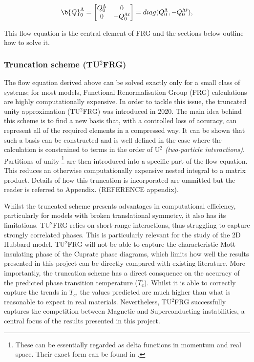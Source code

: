 \documentclass[12pt]{article}
\begin{document}
\begin{equation}\label{Q0 term }
\b{Q}_0^{\Lambda} =
\begin{bmatrix}
Q_0^{\Lambda} & 0 \\
0 & -Q_0^{\Lambda t}
\end{bmatrix}
= diag(Q_0^{\Lambda}, - Q_0^{\Lambda t}),
\end{equation}

\noindent This flow equation is the central element of FRG and the sections below outline how to solve it.


\subsubsection{Truncation scheme (TU$^2$FRG)}
\label{subsubsec:Truncation scheme}


The flow equation derived above can be solved exactly only for a small class of systems; for most models, Functional Renormalisation Group (FRG) 
calculations are highly computationally expensive.
In order to tackle this issue, the truncated unity approximation (TU$^2$FRG) was introduced in 2020\cite{eckhardt2020truncated}. 
The main idea behind this scheme is to find a new basis that, with a controlled loss of accuracy, can represent all 
of the required elements in a compressed way. It can be shown that such a basis can be constructed and is 
well defined in the case where the calculation is constrained to terms in the order of U$^{2}$ \textit{(two-particle interactions)}\cite{lichtenstein2018functional}.
Partitions of unity \footnote{These can be essentially regarded as delta functions in momentum and real space. Their exact form can be found in \cite{lichtenstein2018functional}.} are then introduced into a specific part of the flow equation. This reduces an otherwise computationally expensive nested integral to a matrix product. 
Details of how this truncation is incorporated are ommitted but the reader is referred to Appendix. (REFERENCE appendix).\par
\medskip

\noindent Whilst the truncated scheme presents advantages in computational efficiency, particularly for models with broken translational symmetry, it also has its limitations. 
TU$^2$FRG relies on short-range interactions, thus struggling to capture strongly correlated phases. 
This is particularly relevant for the study of the 2D Hubbard model. TU$^2$FRG will not be able to capture
the characteristic Mott insulating phase of the Cuprate phase diagrams\cite{imada1998metal}, which limits how well the results presented in this project can be directly compared with existing literature. 
More importantly, the truncation scheme has a direct consquence on the accuracy of the predicted phase transition temperature ($T_c$). Whilst it is able to correctly capture
the trends in $T_c$, the values predicted are much higher than what is reasonable to expect in real materials.
Nevertheless, TU$^2$FRG successfully captures the competition between Magnetic and Superconducting instabilities, a central focus of the results presented in this project. 
\end{document}
